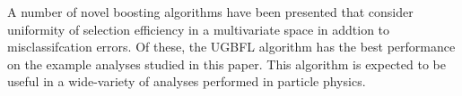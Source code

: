 A number of novel boosting algorithms have been presented that consider uniformity of selection efficiency in a multivariate space in addtion to misclassifcation errors.  Of these, the UGBFL algorithm has the best performance on the example analyses studied in this paper.
This algorithm is expected to be useful in a wide-variety of analyses performed in particle physics.
